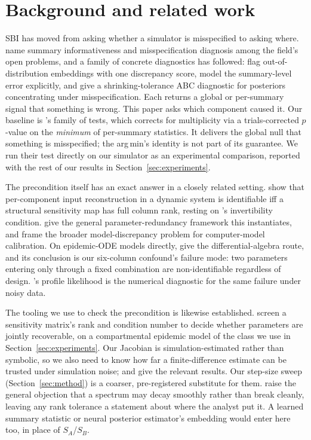 \documentclass{article}
\begin{document}
\section{Background and related work}
\label{sec:background}

SBI has moved from asking whether a simulator is misspecified to asking where.
\citet{Cranmer_2020} name summary informativeness and misspecification diagnosis among the
field's open problems, and a family of concrete diagnostics has followed:
\citet{schmitt2022detectingmodelmisspecificationamortized} flag out-of-distribution embeddings
with one discrepancy score, \citet{ward2022robustneuralposteriorestimation} model the
summary-level error explicitly, and \citet{Frazier_2020} give a shrinking-tolerance ABC
diagnostic for posteriors concentrating under misspecification. Each returns a global or
per-summary signal that something is wrong. This paper asks which component caused it.
Our baseline is
\citet{montel2025testsmodelmisspecificationsimulationbased}'s family of tests, which corrects
for multiplicity via a trials-corrected $p$-value on the \emph{minimum} of per-summary
statistics. It delivers the global null that something is misspecified; the arg\,min's
identity is not part of its guarantee. We run their test directly on our simulator as an experimental
comparison, reported with the rest of our results in Section~\ref{sec:experiments}.

The precondition itself has an exact answer in a closely related setting. \citet{Kahl_2019}
show that per-component input reconstruction in a dynamic system is identifiable iff a
structural sensitivity map has full column rank, resting on \citet{Sain_1969}'s invertibility
condition. \citet{CatchpoleMorgan_1997} give the general parameter-redundancy framework this
instantiates, and \citet{Brynjarsd_ttir_2014} frame the broader model-discrepancy problem for
computer-model calibration. On epidemic-ODE models directly, \citet{Miao_2011} give the
differential-algebra route, and its conclusion is our six-column confound's failure
mode: two parameters entering only through a fixed combination are non-identifiable regardless
of design. \citet{Raue_2009}'s profile likelihood is the numerical diagnostic for the same
failure under noisy data.

The tooling we use to check the precondition is likewise established.
\citet{Cintr_n_Arias_2009} screen a sensitivity matrix's rank and condition number to decide
whether parameters are jointly recoverable, on a compartmental epidemic model of the class we
use in Section~\ref{sec:experiments}. Our Jacobian is simulation-estimated rather than
symbolic, so we also need to know how far a finite-difference estimate can be trusted under
simulation noise; \citet{Mor__2011} and \citet{Mor__2012} give the relevant results. Our
step-size sweep (Section~\ref{sec:method}) is a coarser, pre-registered substitute for them.
\citet{Gutenkunst_2007} raise the general objection that a spectrum may decay smoothly rather
than break cleanly, leaving any rank tolerance a statement about where the analyst put
it. A learned summary statistic or neural posterior estimator's embedding would enter here too, in
place of $S_A$/$S_B$.
\end{document}
